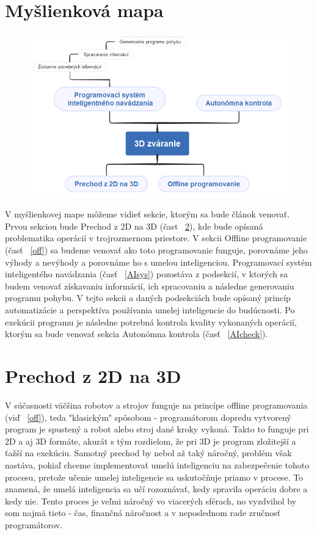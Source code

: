 \documentclass[10pt,twoside,slovak,a4paper]{article}
\begin{document}
\section{Myšlienková mapa} \label{mapa} %

\begin{figure}[htbp]
\centerline{\includegraphics{myšlienková_mapa3.png}}
\label{fig}
\end{figure}

V myšlienkovej mape môžeme vidieť sekcie, ktorým sa bude článok venovať. Prvou sekciou bude Prechod z 2D na 3D (čast ~\ref{2dto3d}), kde bude opísaná problematika operácií v trojrozmernom priestore. V sekcii Offline programovanie (časť ~\ref{off}) sa budeme venovať ako toto programovanie funguje, porovnáme jeho výhody a nevýhody a porovnáme ho s umelou inteligenciou. Programovací systém inteligentého navádzania (časť ~\ref{AIsys})\cite{hlavny_zdroj} pozostáva z podsekcií, v ktorých sa budem venovať získavaniu informácií, ich spracovaniu a následne generovaniu programu pohybu. V tejto sekcii a daných podsekciách bude opísaný princíp automatizácie a perspektíva používania umelej inteligencie do budúcnosti. Po exekúcii programu je následne potrebná kontrola kvality vykonaných operácií, ktorým sa bude venovať sekcia Autonómna kontrola\cite{hlavny_zdroj} (časť ~\ref{AIcheck}).

\newpage
\section{Prechod z 2D na 3D} \label{2dto3d} %

V súčasnosti väčšina robotov a strojov funguje na princípe offline programovania (viď ~\ref{off}), teda "klasickým" spôsobom - programátorom dopredu vytvorený program je spustený a robot alebo stroj dané kroky vykoná. Takto to funguje pri 2D a aj 3D formáte, akurát s tým rozdielom, že pri 3D je program zložitejší a ťažší na exekúciu. Samotný prechod by nebol až taký náročný, problém však nastáva, pokiaľ chceme implementovať umelú inteligenciu na zabezpečenie tohoto procesu, pretože učenie umelej inteligencie sa uskutočňuje priamo v procese.\cite{hlavny_zdroj}  To znamená, že umelá inteligencia sa učí rozoznávať, kedy spravila operáciu dobre a kedy nie. Tento proces je veľmi náročný vo viacerých sférach, no vyzdvihol by som najmä tieto - čas, finančná náročnost a v neposlednom rade zručnosť programátorov.
\end{document}
